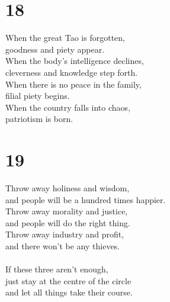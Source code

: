 \documentclass[b5paper, 12pt, oneside]{book}
\begin{document}
\chapter*{18}
When the great Tao is forgotten,\\
goodness and piety appear.\\
When the body's intelligence declines,\\
cleverness and knowledge step forth.\\
When there is no peace in the family,\\
filial piety begins.\\
When the country falls into chaos,\\
patriotism is born.\\

\chapter*{19}
Throw away holiness and wisdom,\\
and people will be a hundred times happier.\\
Throw away morality and justice,\\
and people will do the right thing.\\
Throw away industry and profit,\\
and there won't be any thieves.\\
\\
If these three aren't enough,\\
just stay at the centre of the circle\\
and let all things take their course.\\
\end{document}
